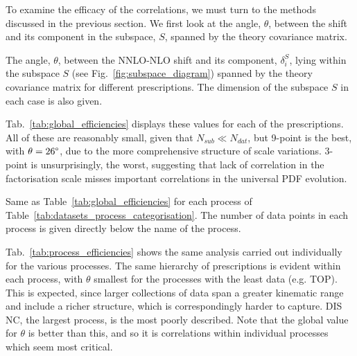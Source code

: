 To examine the efficacy of the correlations, we must turn to the methods discussed in the previous section. We first look at the angle, $\theta$, between the shift and its component in the subspace, $S$, spanned by the theory covariance matrix. 
\begin{table}[H]
	\centering
	
        \vspace{5mm}
	\caption{\small The angle, $\theta$, between the NNLO-NLO
          shift and its component, $\delta_i^S$, lying within the
          subspace $S$ (see Fig.~\ref{fig:subspace_diagram})
          spanned by the theory covariance matrix for  different
          prescriptions. The dimension of the subspace $S$ in each case
          is also given.}
	\label{tab:global_efficiencies}
\end{table}
Tab.~\ref{tab:global_efficiencies} displays these values for each of the prescriptions. All of these are reasonably small, given that $N_{sub} \ll N_{dat}$, but 9-point is the best, with $\theta = 26 \degree$, due to the more comprehensive structure of scale variations. 3-point is unsurprisingly, the worst, suggesting that lack of correlation in the factorisation scale misses important correlations in the universal PDF evolution.
\begin{table}[H]
	\centering
	\small
	
        \vspace{3mm}
	\caption{Same as Table~\ref{tab:global_efficiencies}
          for each process of Table~\ref{tab:datasets_process_categorisation}. The number of data points in each process is given directly below the name of the process.}
	\label{tab:process_efficiencies}
\end{table}
Tab.~\ref{tab:process_efficiencies} shows the same analysis carried out individually for the various processes. The same hierarchy of prescriptions is evident within each process, with $\theta$ smallest for the processes with the least data (e.g. TOP). This is expected, since larger collections of data span a greater kinematic range and include a richer structure, which is correspondingly harder to capture. DIS NC, the largest process, is the most poorly described. Note that the global value for $\theta$ is better than this, and so it is correlations within individual processes which seem most critical.

